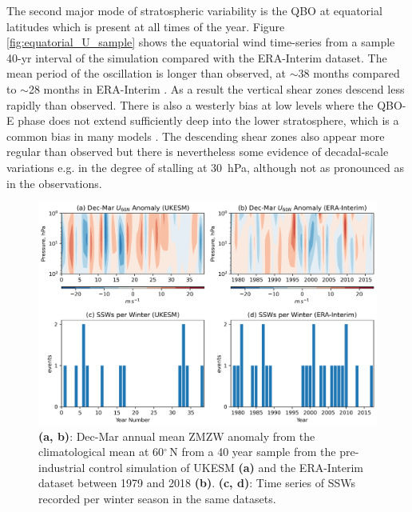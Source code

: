 The second major mode of stratospheric variability is the QBO at equatorial latitudes which is present at all times of the year. Figure \ref{fig:equatorial_U_sample} shows the equatorial wind time-series from a sample 40-yr interval of the simulation compared with the ERA-Interim dataset. The mean period of the oscillation is longer than observed, at $\sim$38 months compared to $\sim$28 months in ERA-Interim \citep{kawataniRepresentation2016}. As a result the vertical shear zones descend less rapidly than observed. There is also a westerly bias at low levels where the QBO-E phase does not extend sufficiently deep into the lower stratosphere, which is a common bias in many models \citep{bushellEvaluation2020b}. The descending shear zones also appear more regular than observed but there is nevertheless some evidence of decadal-scale variations e.g. in the degree of stalling at 30\ hPa, although not as pronounced as in the observations.

\begin{figure}[h!]
\begin{center}
\noindent\includegraphics[width = \linewidth]{Figures/Figures-origins/SSW_series_ERA_UKESM.png}
\caption[Vortex ZMZW and SSW time series from UKESM pi-control and ERA-Interim]{\textbf{(a, b)}: Dec-Mar annual mean ZMZW anomaly from the climatological mean at 60$^\circ$\,N from a 40 year sample from the pre-industrial control simulation of UKESM \textbf{(a)} and the ERA-Interim dataset between 1979 and 2018 \textbf{(b)}. \textbf{(c, d)}: Time series of SSWs recorded per winter season in the same datasets.}
\label{fig:SSW_series_sample}
\end{center}
\end{figure}

